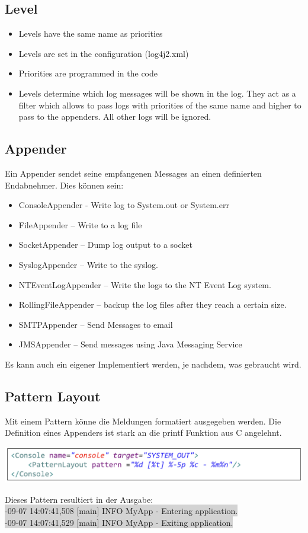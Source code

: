 \documentclass[10pt]{article}
\newcommand\graybox[1]{\colorbox{lightgray}{\ttfamily #1}} %
\begin{document}
	\subsection{Level}
	\begin{itemize}
		\item Levels have the same name as priorities
		\item Levels are set in the configuration (log4j2.xml)
		\item Priorities are programmed in the code
		\item Levels determine which log messages will be shown in the log. They act as a filter which allows to pass logs with priorities of the same name and higher to pass to the appenders. All other logs will be ignored.
	\end{itemize}
	\subsection{Appender}
	Ein Appender sendet seine empfangenen Messages an einen definierten Endabnehmer. Dies können sein:
	\begin{itemize}
		\item ConsoleAppender - Write log to System.out or System.err
		\item FileAppender – Write to a log file
		\item SocketAppender – Dump log output to a socket
		\item SyslogAppender – Write to the syslog.
		\item NTEventLogAppender – Write the logs to the NT Event Log system.
		\item RollingFileAppender – backup the log files after they reach a certain size.
		\item SMTPAppender – Send Messages to email
		\item JMSAppender – Send messages using Java Messaging Service
	\end{itemize}
	Es kann auch ein eigener Implementiert werden, je nachdem, was gebraucht wird.
	
	\subsection{Pattern Layout}
	Mit einem Pattern könne die Meldungen formatiert ausgegeben werden. Die Definition eines Appenders ist stark an die printf Funktion aus C angelehnt.
	\begin{center}
		\includegraphics[scale=0.4]{assets/pattern}
	\end{center}
	Dieses Pattern resultiert in der Ausgabe:\\
	\graybox{2000-09-07 14:07:41,508 [main] INFO MyApp - Entering application.}\\
	\graybox{2000-09-07 14:07:41,529 [main] INFO MyApp - Exiting application. }
	
\end{document}
